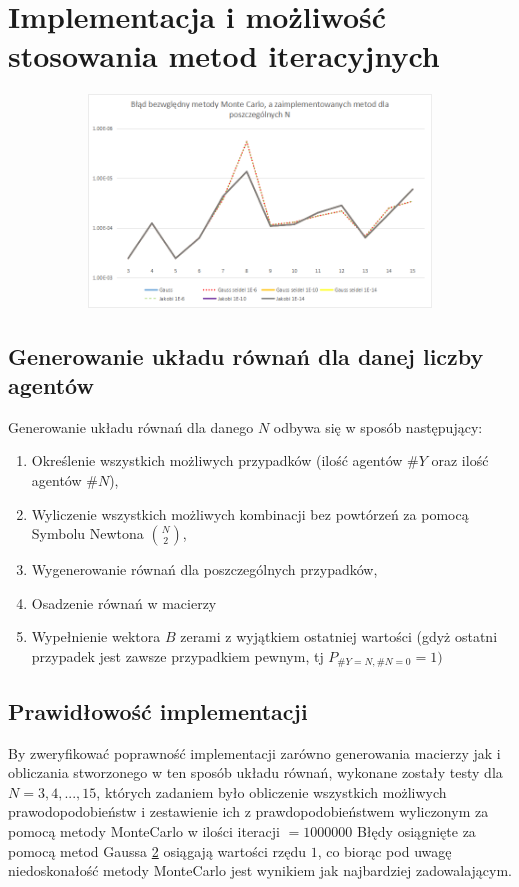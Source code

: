 \documentclass[10pt]{article}
\begin{document}
\section{Implementacja i możliwość stosowania metod iteracyjnych}
\begin{figure}[h]
	\caption{Wykres reprezentujący błąd bezwzględny metod Gaussa oraz metod iteracyjnych względem metody MonteCarlo\label{rys}}
	\centering
	\begin{subfigure}{0.5\textwidth}
		\includegraphics[width=\textwidth]{1.png}
		\caption{ \label{Rys1a}}
	\end{subfigure}
\end{figure}
\subsection{Generowanie układu równań dla danej liczby agentów}
Generowanie układu równań dla danego $N$ odbywa się w sposób następujący:
\begin{enumerate}
	\item Określenie wszystkich możliwych przypadków (ilość agentów $\#Y$ oraz ilość agentów $\#N$),
	\item Wyliczenie wszystkich możliwych kombinacji bez powtórzeń za pomocą Symbolu Newtona ${{N} \choose {2}}$,
	\item Wygenerowanie równań dla poszczególnych przypadków,
	\item Osadzenie równań w macierzy
	\item Wypełnienie wektora $B$ zerami z wyjątkiem ostatniej wartości (gdyż ostatni przypadek jest zawsze przypadkiem pewnym, tj $P_{\#Y=N,\#N=0}=1)$
\end{enumerate}
\subsection{Prawidłowość implementacji}
By zweryfikować poprawność implementacji zarówno generowania macierzy jak i obliczania stworzonego w ten sposób układu równań, wykonane zostały testy dla $N = 3,4,...,15$, których zadaniem było obliczenie wszystkich możliwych prawodopodobieństw i zestawienie ich z prawdopodobieństwem wyliczonym za pomocą metody MonteCarlo w ilości iteracji $=1000000$
Błędy osiągnięte za pomocą metod Gaussa \ref{Rys1a} osiągają wartości rzędu $1$, co biorąc pod uwagę niedoskonałość metody MonteCarlo jest wynikiem jak najbardziej zadowalającym.
\end{document}

